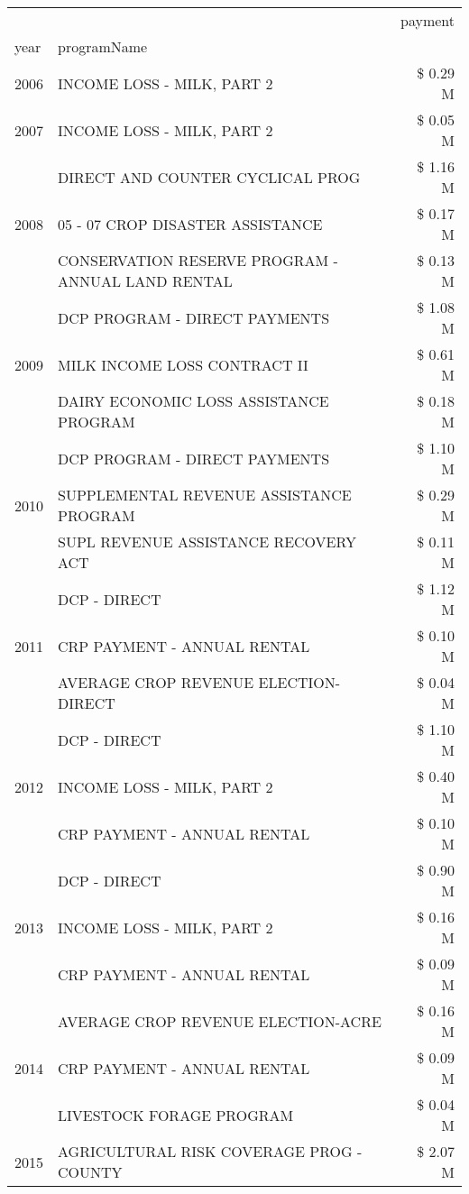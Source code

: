 \begin{tabular}{llr}
\toprule
 &  & payment \\
year & programName &  \\
\midrule
2006 & INCOME LOSS - MILK, PART 2 & \$ 0.29 M \\
\cline{1-3}
2007 & INCOME LOSS - MILK, PART 2 & \$ 0.05 M \\
\cline{1-3}
\multirow[t]{3}{*}{2008} & DIRECT AND COUNTER CYCLICAL PROG & \$ 1.16 M \\
 & 05 - 07 CROP DISASTER ASSISTANCE & \$ 0.17 M \\
 & CONSERVATION RESERVE PROGRAM - ANNUAL LAND RENTAL & \$ 0.13 M \\
\cline{1-3}
\multirow[t]{3}{*}{2009} & DCP PROGRAM - DIRECT PAYMENTS & \$ 1.08 M \\
 & MILK INCOME LOSS CONTRACT II & \$ 0.61 M \\
 & DAIRY ECONOMIC LOSS ASSISTANCE PROGRAM & \$ 0.18 M \\
\cline{1-3}
\multirow[t]{3}{*}{2010} & DCP PROGRAM - DIRECT PAYMENTS & \$ 1.10 M \\
 & SUPPLEMENTAL REVENUE ASSISTANCE PROGRAM & \$ 0.29 M \\
 & SUPL REVENUE ASSISTANCE RECOVERY ACT & \$ 0.11 M \\
\cline{1-3}
\multirow[t]{3}{*}{2011} & DCP - DIRECT & \$ 1.12 M \\
 & CRP PAYMENT - ANNUAL RENTAL & \$ 0.10 M \\
 & AVERAGE CROP REVENUE ELECTION-DIRECT & \$ 0.04 M \\
\cline{1-3}
\multirow[t]{3}{*}{2012} & DCP - DIRECT & \$ 1.10 M \\
 & INCOME LOSS - MILK, PART 2 & \$ 0.40 M \\
 & CRP PAYMENT - ANNUAL RENTAL & \$ 0.10 M \\
\cline{1-3}
\multirow[t]{3}{*}{2013} & DCP - DIRECT & \$ 0.90 M \\
 & INCOME LOSS - MILK, PART 2 & \$ 0.16 M \\
 & CRP PAYMENT - ANNUAL RENTAL & \$ 0.09 M \\
\cline{1-3}
\multirow[t]{3}{*}{2014} & AVERAGE CROP REVENUE ELECTION-ACRE & \$ 0.16 M \\
 & CRP PAYMENT - ANNUAL RENTAL & \$ 0.09 M \\
 & LIVESTOCK FORAGE PROGRAM & \$ 0.04 M \\
\cline{1-3}
\multirow[t]{3}{*}{2015} & AGRICULTURAL RISK COVERAGE PROG - COUNTY & \$ 2.07 M \\

\end{tabular}
